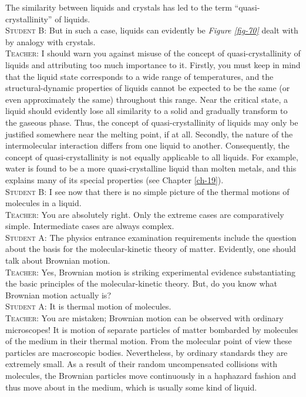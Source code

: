 \documentclass[a4paper,sfsidenotes]{tufte-book}
\begin{document}
The similarity between liquids and crystals has led to the term ``quasi-crystallinity'' of liquids.
\\
\textsc{Student B:} But in such a case, liquids can evidently be \emph{Figure \ref{fig-70}} dealt with by analogy with crystals.
\\
\textsc{Teacher:} I should warn you against misuse of the concept of quasi-crystallinity of liquids and attributing too much importance to it. Firstly, you must keep in mind that the liquid state corresponds to a wide range of temperatures, and the structural-dynamic properties of liquids cannot be expected to be the same (or even approximately the same) throughout this range. Near the critical state, a liquid should evidently lose all similarity to a solid and gradually transform to the gaseous phase. Thus, the concept of quasi-crystallinity of liquids may only be justified somewhere near the melting point, if at all. Secondly, the nature of the intermolecular interaction differs from one liquid to another. Consequently, the concept of quasi-crystallinity is not equally applicable to all liquids. For example, water is found to be a more quasi-crystalline liquid than molten metals, and this explains many of its special properties (see  Chapter \ref{ch-19}).
\\
\textsc{Student B:} I see now that there is no simple picture of the thermal motions of molecules in a liquid.
\\
\textsc{Teacher:} You are absolutely right. Only the extreme cases are comparatively simple. Intermediate cases are always complex.
\\
\textsc{Student A:} The physics entrance examination requirements include the question about the basis for the molecular-kinetic theory of matter. Evidently, one should talk about Brownian motion.
\\
\textsc{Teacher:} Yes, Brownian motion is striking experimental evidence substantiating the basic principles of the molecular-kinetic theory. But, do you know what Brownian motion actually is?
\\
\textsc{Student A:} It is thermal motion of molecules.
\\
\textsc{Teacher:} You are mistaken; Brownian motion can be observed with ordinary microscopes! It is motion of separate particles of matter bombarded by molecules of the medium in their thermal motion. From the molecular point of view these particles are macroscopic bodies. Nevertheless, by ordinary standards they are extremely small. As a result of their random uncompensated collisions with molecules, the Brownian particles move continuously in a haphazard fashion and thus move about in the medium, which is usually some kind of liquid.
\end{document}
